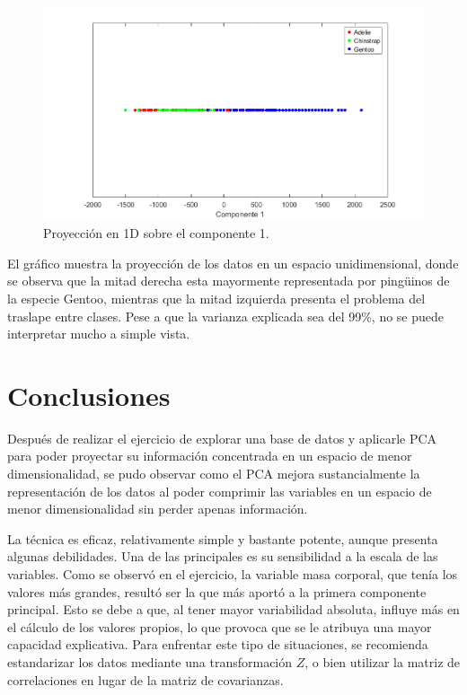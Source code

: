 \documentclass[11pt, letterpaper]{article}
\begin{document}
\begin{figure}[h!]
	\centering
	\begin{minipage}{1.1\textwidth}
		\centering
		\includegraphics[width=\textwidth]{IMG/G3.png}
		\caption{Proyección en 1D sobre el componente 1.}
		\label{fig:f7}
	\end{minipage}\hfill
\end{figure}

El gráfico muestra la proyección de los datos en un espacio unidimensional, donde se observa que la mitad derecha esta mayormente representada por pingüinos de la especie Gentoo, mientras que la mitad izquierda presenta el problema del traslape entre clases. Pese a que la varianza explicada sea del 99\%, no se puede interpretar mucho a simple vista.




\newpage
	
\section{Conclusiones}
	
Después de realizar el ejercicio de explorar una base de datos y aplicarle PCA para poder proyectar su información concentrada en un espacio de menor dimensionalidad, se pudo observar como el PCA mejora sustancialmente la representación de los datos al poder comprimir las variables en un espacio de menor dimensionalidad sin perder apenas información.

La técnica es eficaz, relativamente simple y bastante potente, aunque presenta algunas debilidades. Una de las principales es su sensibilidad a la escala de las variables. Como se observó en el ejercicio, la variable masa corporal, que tenía los valores más grandes, resultó ser la que más aportó a la primera componente principal. Esto se debe a que, al tener mayor variabilidad absoluta, influye más en el cálculo de los valores propios, lo que provoca que se le atribuya una mayor capacidad explicativa. Para enfrentar este tipo de situaciones, se recomienda estandarizar los datos mediante una transformación $Z$, o bien utilizar la matriz de correlaciones en lugar de la matriz de covarianzas.
\end{document}
